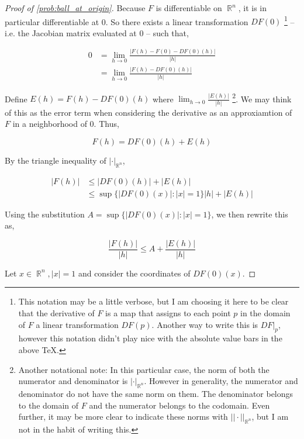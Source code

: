 \documentclass[english]{article}
\DeclareMathOperator{\R}{\mathbb{R}}
\DeclareMathOperator{\<}{\langle}
\renewcommand{\>}{\rangle}
\theoremstyle{definition}
\begin{document}
\begin{proof}[Proof of \cref{prob:ball_at_origin}]
    Because $F$ is differentiable on $\R^n$, it is in particular differentiable at 0. So there exists a linear transformation $DF(0)$ \footnote{This notation may be a little verbose, but I am choosing it here to be clear that the derivative of $F$ is a map that assigns to each point $p$ in the domain of $F$ a linear transformation $DF(p)$. Another way to write this is $DF|_p$, however this notation didn't play nice with the absolute value bars in the above TeX.} -- i.e. the Jacobian matrix evaluated at 0 -- such that,

    \begin{align*}
        0
        & = \lim_{h \to 0} \frac{|F(h) - F(0) - DF(0)(h)|}{|h|} \\
        & = \lim_{h \to 0} \frac{|F(h) - DF(0)(h)|}{|h|}
    \end{align*}

    Define $E(h) = F(h) - DF(0)(h)$ where $\lim_{h \to 0} \frac{|E(h)|}{|h|}$ \footnote{Another notational note: In this particular case, the norm of both the numerator and denominator is $| \cdot |_{\R^n}$. However in generality, the numerator and denominator do not have the same norm on them. The denominator belongs to the domain of $F$ and the numerator belongs to the codomain. Even further, it may be more clear to indicate these norms with $||\cdot||_{\R^n}$, but I am not in the habit of writing this.}. We may think of this as the error term when considering the derivative as an approxiamtion of $F$ in a neighborhood of 0. Thus,

    \[
      F(h) = DF(0)(h) + E(h)
    \]

    By the triangle inequality of $|\cdot|_{\R^n}$,

    \begin{align*}
        |F(h)| 
        & \leq |DF(0)(h)| + |E(h)| \\
        & \leq \sup \{\left|DF(0)(x)\right| : |x| = 1\} |h| + |E(h)|
    \end{align*}

    Using the substitution $A = \sup \{\left|DF(0)(x)\right| : |x| = 1\}$, we then rewrite this as,

    \begin{equation}
        \label{eqn:prob:ball_at_origin}
        \frac{|F(h)|}{|h|} \leq A + \frac{|E(h)|}{|h|}
    \end{equation}
    
    Let $x \in \R^n, |x| = 1$ and consider the coordinates of $DF(0)(x)$. 


\end{proof}
\end{document}
